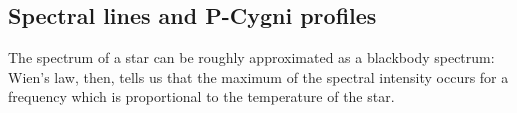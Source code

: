 \documentclass[main.tex]{subfiles}
\begin{document}





\subsection{Spectral lines and P-Cygni profiles}

The spectrum of a star can be roughly approximated as a blackbody spectrum: Wien's law, then, tells us that the maximum of the spectral intensity occurs for a frequency which is proportional to the temperature of the star.
\end{document}
